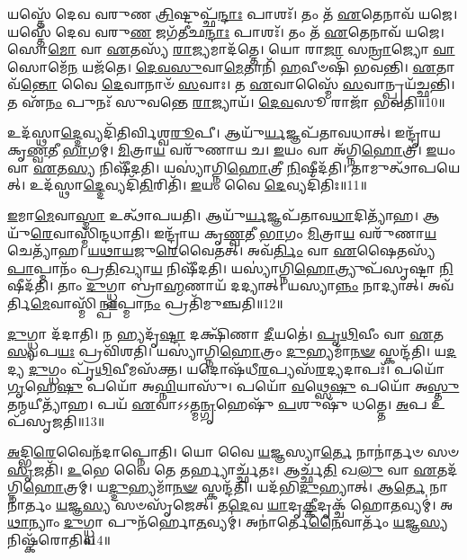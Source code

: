 𑌯𑌸𑍍𑌤𑍇᳴ 𑌦𑍇𑌵 𑌵𑌰𑍁𑌣 \ul{𑌤𑍍𑌰𑌿}\-𑌷𑍍𑌟𑍁𑌪𑍍𑌛᳴\-\ul{𑌨𑍍𑌦𑌾𑌃} 𑌪𑌾𑌶𑌃᳴।
𑌤𑌂 𑌤᳴ \ul{𑌏}\-𑌤𑍇𑌨𑌾𑌵᳴ 𑌯𑌜𑍇।
𑌯𑌸𑍍𑌤𑍇᳴ 𑌦𑍇𑌵 𑌵𑌰𑍁\-\ul{𑌣} 𑌜𑌗᳴𑌤𑍀𑌛\-\ul{𑌨𑍍𑌦𑌾𑌃} 𑌪𑌾𑌶𑌃᳴।
𑌤𑌂 𑌤᳴ \ul{𑌏}\-𑌤𑍇𑌨𑌾𑌵᳴ 𑌯𑌜𑍇।
𑌸𑍋\-\ul{𑌮𑍋} 𑌵𑌾 \ul{𑌏}\-𑌤𑌸𑍍𑌯᳴ \ul{𑌰𑌾}\-𑌜𑍍𑌯𑌮𑌾𑌦᳴𑌤𑍍𑌤𑍇।
𑌯𑍋 𑌰𑌾\-\ul{𑌜𑌾} 𑌸\-\ul{𑌨𑍍𑌰𑌾}\-𑌜𑍍𑌯𑍋 \ul{𑌵𑌾} 𑌸𑍋𑌮𑍇᳴\-\ul{𑌨} 𑌯𑌜᳴𑌤𑍇।
\-\ul{𑌦𑍇}\-\-\ul{𑌵}\-\-\ul{𑌸𑍁}\-𑌵𑌾\-\ul{𑌮𑍇}\-𑌤𑌾𑌨𑌿᳴ \ul{𑌹}\-𑌵𑍀𑍞𑌷𑌿᳴ 𑌭𑌵𑌨𑍍𑌤𑌿।
\-\ul{𑌏}\-𑌤𑌾𑌵᳴\-\ul{𑌨𑍍𑌤𑍋} 𑌵𑍈 \ul{𑌦𑍇}\-𑌵𑌾𑌨𑌾𑍞᳴ \ul{𑌸}\-𑌵𑌾𑌃।
𑌤 \ul{𑌏}\-𑌵𑌾𑌸𑍍𑌮𑍈᳴ \ul{𑌸}\-𑌵𑌾𑌨𑍍𑌪𑍍𑌰𑌯᳴𑌚𑍍𑌛𑌨𑍍𑌤𑌿।
𑌤 𑌏᳴\-\ul{𑌨𑌂} 𑌪𑍁𑌨𑌃᳴ 𑌸𑍁𑌵𑌨𑍍𑌤𑍇 \ul{𑌰𑌾}\-𑌜𑍍𑌯𑌾𑌯᳴।
\-\ul{𑌦𑍇}\-\-\ul{𑌵}\-𑌸𑍂 𑌰𑌾𑌜𑌾᳴ 𑌭𑌵𑌤𑌿॥10॥\anuvakamend[𑌸𑍋𑌮᳴ 𑌆\-\ul{𑌵𑌿}\-𑌶𑌨𑍍 𑌯᳴𑌜𑍇 \ul{𑌰𑌾}\-𑌜𑍍𑌯𑌾𑌯𑍈𑌕𑌂᳴ 𑌚]

𑌉𑌦᳴𑌸𑍍𑌥𑌾\-\ul{𑌦𑍍𑌦𑍇}\-𑌵𑍍𑌯𑌦𑌿᳴𑌤𑌿𑌰𑍍𑌵𑌿𑌶𑍍𑌵\-\ul{𑌰𑍂}\-𑌪𑍀।
𑌆𑌯𑍁᳴\-\ul{𑌰𑍍𑌯}\-𑌜𑍍𑌞𑌪᳴𑌤𑌾𑌵𑌧𑌾𑌤𑍍।
𑌇𑌨𑍍𑌦𑍍𑌰𑌾᳴𑌯 𑌕𑍃\-\ul{𑌣𑍍𑌵}\-𑌤𑍀 \ul{𑌭𑌾}\-𑌗𑌮𑍍।
\-\ul{𑌮𑌿}\-𑌤𑍍𑌰𑌾\-\ul{𑌯} 𑌵𑌰𑍁᳴𑌣𑌾𑌯 𑌚।
\-\ul{𑌇}\-𑌯𑌂 𑌵𑌾 𑌅᳴𑌗𑍍𑌨𑌿\-\ul{𑌹𑍋}\-𑌤𑍍𑌰𑍀।
\-\ul{𑌇}\-𑌯𑌂 𑌵𑌾 \ul{𑌏}\-𑌤\-\ul{𑌸𑍍𑌯} 𑌨𑌿𑌷𑍀᳴𑌦𑌤𑌿।
𑌯𑌸𑍍𑌯𑌾॑𑌗𑍍𑌨𑌿\-\ul{𑌹𑍋}\-𑌤𑍍𑌰𑍀 \ul{𑌨𑌿}\-𑌷𑍀𑌦᳴𑌤𑌿।
𑌤𑌾𑌮𑍁𑌤𑍍𑌥𑌾᳴𑌪𑌯𑍇𑌤𑍍।
𑌉𑌦᳴𑌸𑍍𑌥𑌾\-\ul{𑌦𑍍𑌦𑍇}\-𑌵𑍍𑌯𑌦𑌿᳴\-\ul{𑌤𑌿}\-𑌰𑌿𑌤𑌿᳴।
\-\ul{𑌇}\-𑌯𑌂 𑌵𑍈 \ul{𑌦𑍇}\-𑌵𑍍𑌯𑌦𑌿᳴𑌤𑌿𑌃॥11॥

\-\ul{𑌇}\-𑌮𑌾\-\ul{𑌮𑍇}\-𑌵𑌾\-\ul{𑌸𑍍𑌮𑌾} 𑌉𑌤𑍍𑌥𑌾᳴𑌪𑌯𑌤𑌿।
𑌆𑌯𑍁᳴\-\ul{𑌰𑍍𑌯}\-𑌜𑍍𑌞𑌪᳴𑌤𑌾𑌵\-\ul{𑌧𑌾}\-𑌦𑌿𑌤𑍍𑌯𑌾᳴𑌹।
𑌆𑌯𑍁᳴\-\ul{𑌰𑍇}\-𑌵𑌾𑌸𑍍𑌮𑌿᳴𑌨𑍍𑌦𑌧𑌾𑌤𑌿।
𑌇𑌨𑍍𑌦𑍍𑌰𑌾᳴𑌯 𑌕𑍃\-\ul{𑌣𑍍𑌵}\-𑌤𑍀 \ul{𑌭𑌾}\-𑌗𑌂 \ul{𑌮𑌿}\-𑌤𑍍𑌰𑌾\-\ul{𑌯} 𑌵𑌰𑍁᳴𑌣𑌾\-\ul{𑌯} 𑌚𑍇𑌤𑍍𑌯𑌾᳴𑌹।
\-\ul{𑌯}\-\-\ul{𑌥𑌾}\-\-\ul{𑌯}\-𑌜𑍁\-\ul{𑌰𑍇}\-𑌵𑍈𑌤𑌤𑍍।
𑌅𑌵᳴\-\ul{𑌰𑍍𑌤𑌿𑌂} 𑌵𑌾 \ul{𑌏}\-𑌷𑍈𑌤𑌸𑍍𑌯᳴ \ul{𑌪𑌾}\-𑌪𑍍𑌮𑌾𑌨𑌂᳴ 𑌪𑍍𑌰\-\ul{𑌤𑌿}\-𑌖𑍍𑌯𑌾\-\ul{𑌯} 𑌨𑌿𑌷𑍀᳴𑌦𑌤𑌿।
𑌯𑌸𑍍𑌯𑌾॑𑌗𑍍𑌨𑌿\-\ul{𑌹𑍋}\-𑌤𑍍𑌰𑍍𑌯𑍁𑌪᳴𑌸𑍃𑌷𑍍𑌟𑌾 \ul{𑌨𑌿}\-𑌷𑍀𑌦᳴𑌤𑌿।
𑌤𑌾𑌂 \ul{𑌦𑍁}\-𑌗𑍍𑌧𑍍𑌵𑌾 𑌬𑍍𑌰𑌾॑\-\ul{𑌹𑍍𑌮}\-𑌣𑌾𑌯᳴ 𑌦𑌦𑍍𑌯𑌾𑌤𑍍।
𑌯𑌸𑍍𑌯𑌾\-\ul{𑌨𑍍𑌨𑌂} 𑌨𑌾𑌦𑍍𑌯𑌾𑌤𑍍।
𑌅𑌵᳴𑌰𑍍𑌤𑌿\-\ul{𑌮𑍇}\-𑌵𑌾𑌸𑍍𑌮𑌿᳴\-\ul{𑌨𑍍𑌪𑌾}\-𑌪𑍍𑌮𑌾\-\ul{𑌨𑌂} 𑌪𑍍𑌰𑌤𑌿᳴\-𑌮𑍁𑌞𑍍𑌚𑌤𑌿॥12॥

\-\ul{𑌦𑍁}\-𑌗𑍍𑌧𑍍𑌵𑌾 𑌦᳴𑌦𑌾𑌤𑌿।
𑌨 𑌹𑍍𑌯𑌦𑍃᳴\-\ul{𑌷𑍍𑌟𑌾} 𑌦𑌕𑍍𑌷𑌿᳴𑌣𑌾 \ul{𑌦𑍀}\-𑌯𑌤𑍇॑।
\-\ul{𑌪𑍃}\-\-\ul{𑌥𑌿}\-𑌵𑍀𑌂 𑌵𑌾 \ul{𑌏}\-𑌤\-\ul{𑌸𑍍𑌯} 𑌪\-\ul{𑌯𑌃} 𑌪𑍍𑌰𑌵𑌿᳴𑌶𑌤𑌿।
𑌯𑌸𑍍𑌯𑌾॑𑌗𑍍𑌨𑌿\-\ul{𑌹𑍋}\-𑌤𑍍𑌰𑌂 \ul{𑌦𑍁}\-𑌹𑍍𑌯𑌮𑌾᳴\-\ul{𑌨}\-\-\ul{𑍟} 𑌸𑍍𑌕𑌨𑍍𑌦᳴𑌤𑌿।
𑌯\-\ul{𑌦}\-𑌦𑍍𑌯 \ul{𑌦𑍁}\-𑌗𑍍𑌧𑌂 𑌪𑍃᳴\-\ul{𑌥𑌿}\-𑌵𑍀𑌮𑌸᳴𑌕𑍍𑌤।
𑌯𑌦𑍋𑌷᳴𑌧𑍀\-\ul{𑌰}\-𑌪𑍍𑌯𑌸᳴\-\ul{𑌰}\-𑌦𑍍𑌯𑌦𑌾𑌪𑌃᳴।
𑌪𑌯𑍋᳴ \ul{𑌗𑍃}\-𑌹𑍇\-\ul{𑌷𑍁} 𑌪𑌯𑍋᳴ 𑌅\-\ul{𑌘𑍍𑌨𑌿}\-𑌯𑌾𑌸𑍁᳴।
𑌪𑌯𑍋᳴ \ul{𑌵}\-𑌥𑍍𑌸𑍇\-\ul{𑌷𑍁} 𑌪𑌯𑍋᳴ 𑌅\-\ul{𑌸𑍍𑌤𑍁} 𑌤𑌨𑍍𑌮𑌯𑍀𑌤𑍍𑌯𑌾᳴𑌹।
𑌪𑌯᳴ \ul{𑌏}\-𑌵𑌾𑌽𑌽𑌤𑍍𑌮\-\ul{𑌨𑍍𑌗𑍃}\-𑌹𑍇𑌷𑍁᳴ \ul{𑌪}\-𑌶𑍁𑌷𑍁᳴ 𑌧𑌤𑍍𑌤𑍇।
\-\ul{𑌅}\-𑌪 𑌉𑌪᳴\-𑌸𑍃𑌜𑌤𑌿॥13॥

\-\ul{𑌅}\-𑌦𑍍𑌭𑌿\-\ul{𑌰𑍇}\-𑌵𑍈𑌨᳴𑌦𑌾𑌪𑍍𑌨𑍋𑌤𑌿।
𑌯𑍋 𑌵𑍈 \ul{𑌯}\-𑌜𑍍𑌞𑌸𑍍𑌯𑌾\-\ul{𑌰𑍍𑌤𑍇} 𑌨𑌾𑌨𑌾॑𑌰𑍍𑌤𑍞 𑌸𑍞\-\ul{𑌸𑍃}\-𑌜𑌤𑌿᳴।
\-\ul{𑌉}\-𑌭𑍇 𑌵𑍈 𑌤𑍇 𑌤𑌰𑍍𑌹𑍍𑌯𑌾𑌰𑍍𑌚𑍍𑌛᳴𑌤𑌃।
𑌆𑌰𑍍𑌚𑍍𑌛᳴\-\ul{𑌤𑌿} 𑌖\-\ul{𑌲𑍁} 𑌵𑌾 \ul{𑌏}\-𑌤𑌦᳴𑌗𑍍𑌨𑌿\-\ul{𑌹𑍋}\-𑌤𑍍𑌰𑌮𑍍।
𑌯\-\ul{𑌦𑍍𑌦𑍁}\-𑌹𑍍𑌯𑌮𑌾᳴\-\ul{𑌨}\-\-\ul{𑍟} 𑌸𑍍𑌕𑌨𑍍𑌦᳴𑌤𑌿।
𑌯𑌦᳴𑌭𑌿\-\ul{𑌦𑍁}\-𑌹𑍍𑌯𑌾𑌤𑍍।
𑌆\-\ul{𑌰𑍍𑌤𑍇} 𑌨𑌾𑌨𑌾॑𑌰𑍍𑌤𑌂 \ul{𑌯}\-𑌜𑍍𑌞\-\ul{𑌸𑍍𑌯} 𑌸𑍞𑌸𑍃᳴𑌜𑍇𑌤𑍍।
𑌤\-\ul{𑌦𑍇}\-𑌵 \ul{𑌯𑌾}\-𑌦𑍃\-\ul{𑌕𑍍𑌕𑍀}\-𑌦𑍃𑌕𑍍𑌚᳴ 𑌹𑍋\-\ul{𑌤}\-𑌵𑍍𑌯𑌮𑍍॑।
𑌅\-\ul{𑌥𑌾}\-𑌨𑍍𑌯𑌾𑌂 \ul{𑌦𑍁}\-𑌗𑍍𑌧𑍍𑌵𑌾 𑌪𑍁𑌨᳴𑌰𑍍\mbox{}𑌹𑍋\-\ul{𑌤}\-𑌵𑍍𑌯𑌮𑍍॑।
𑌅𑌨𑌾॑𑌰𑍍𑌤𑍇\-\ul{𑌨𑍈}\-𑌵𑌾𑌰𑍍𑌤𑌂᳴ \ul{𑌯}\-𑌜𑍍𑌞\-\ul{𑌸𑍍𑌯} 𑌨𑌿𑌷𑍍𑌕᳴𑌰𑍋𑌤𑌿॥14॥

